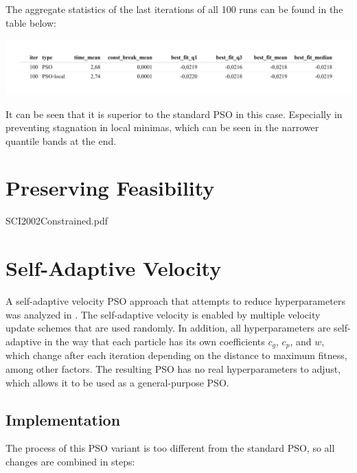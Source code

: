 \documentclass[
  oneside]{book}
\begin{document}
The aggregate statistics of the last iterations of all 100 runs can be found in the table below:

\includegraphics{Master_Thesis_files/figure-latex/variants6-1.png}

It can be seen that it is superior to the standard PSO in this case. Especially in preventing stagnation in local minimas, which can be seen in the narrower quantile bands at the end.

\hypertarget{preserving-feasibility}{%
\section{Preserving Feasibility}\label{preserving-feasibility}}

SCI2002Constrained.pdf

\hypertarget{self-adaptive-velocity}{%
\section{Self-Adaptive Velocity}\label{self-adaptive-velocity}}

A self-adaptive velocity PSO approach that attempts to reduce hyperparameters was analyzed in \citep{FaYa2014}. The self-adaptive velocity is enabled by multiple velocity update schemes that are used randomly. In addition, all hyperparameters are self-adaptive in the way that each particle has its own coefficients \(c_g\), \(c_p\), and \(w\), which change after each iteration depending on the distance to maximum fitness, among other factors. The resulting PSO has no real hyperparameters to adjust, which allows it to be used as a general-purpose PSO.

\hypertarget{implementation-2}{%
\subsection{Implementation}\label{implementation-2}}

The process of this PSO variant is too different from the standard PSO, so all changes are combined in steps:
\end{document}
